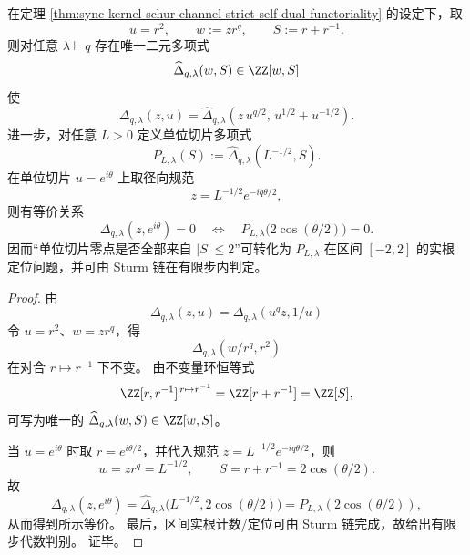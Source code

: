 \begin{corollary}\label{cor:sync-kernel-schur-channel-completion-unit-slice}
在定理 \ref{thm:sync-kernel-schur-channel-strict-self-dual-functoriality} 的设定下，取
\[
u=r^2,\qquad w:=zr^q,\qquad S:=r+r^{-1}.
\]
则对任意 \(\lambda\vdash q\) 存在唯一二元多项式
\[
\widehat\Delta_{q,\lambda}(w,S)\in\ZZ[w,S]
\]
使
\[
\Delta_{q,\lambda}(z,u)=\widehat\Delta_{q,\lambda}\!\left(z\,u^{q/2},\,u^{1/2}+u^{-1/2}\right).
\]
进一步，对任意 \(L>0\) 定义单位切片多项式
\[
P_{L,\lambda}(S):=\widehat\Delta_{q,\lambda}(L^{-1/2},S).
\]
在单位切片 \(u=e^{i\theta}\) 上取径向规范
\[
z=L^{-1/2}e^{-iq\theta/2},
\]
则有等价关系
\[
\Delta_{q,\lambda}(z,e^{i\theta})=0
\quad\Longleftrightarrow\quad
P_{L,\lambda}\!\bigl(2\cos(\theta/2)\bigr)=0.
\]
因而“单位切片零点是否全部来自 \(|S|\le 2\)”可转化为 \(P_{L,\lambda}\) 在区间 \([-2,2]\) 的实根定位问题，并可由 Sturm 链在有限步内判定。
\end{corollary}
\begin{proof}
由
\[
\Delta_{q,\lambda}(z,u)=\Delta_{q,\lambda}(u^q z,1/u)
\]
令 \(u=r^2\)、\(w=zr^q\)，得
\[
\Delta_{q,\lambda}(w/r^q,r^2)
\]
在对合 \(r\mapsto r^{-1}\) 下不变。
由不变量环恒等式
\[
\ZZ[r,r^{-1}]^{\,r\mapsto r^{-1}}=\ZZ[r+r^{-1}]=\ZZ[S],
\]
可写为唯一的 \(\widehat\Delta_{q,\lambda}(w,S)\in\ZZ[w,S]\)。

当 \(u=e^{i\theta}\) 时取 \(r=e^{i\theta/2}\)，并代入规范 \(z=L^{-1/2}e^{-iq\theta/2}\)，则
\[
w=zr^q=L^{-1/2},\qquad S=r+r^{-1}=2\cos(\theta/2).
\]
故
\[
\Delta_{q,\lambda}(z,e^{i\theta})
=
\widehat\Delta_{q,\lambda}\!\bigl(L^{-1/2},2\cos(\theta/2)\bigr)
=
P_{L,\lambda}(2\cos(\theta/2)),
\]
从而得到所示等价。
最后，区间实根计数/定位可由 Sturm 链完成，故给出有限步代数判别。
证毕。
\end{proof}

